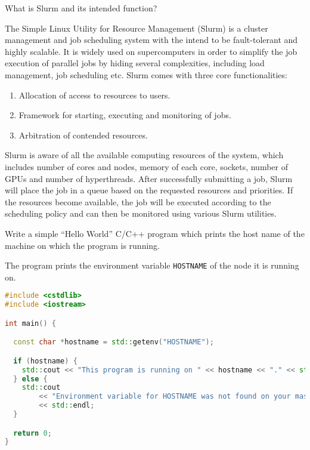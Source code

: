 \begin{question} \label{q:1-2}
What is Slurm and its intended function?
\end{question}
The Simple Linux Utility for Resource Management (Slurm) is a cluster management and job scheduling system with the intend to be fault-tolerant and highly scalable. It is widely used on supercomputers in order to simplify the job execution of parallel jobs by hiding several complexities, including load management, job scheduling etc. Slurm comes with three core functionalities:
\begin{enumerate}
	\item Allocation of access to resources to users.
	\item Framework for starting, executing and monitoring of jobs.
	\item Arbitration of contended resources.
\end{enumerate}
Slurm is aware of all the available computing resources of the system, which includes number of cores and nodes, memory of each core, sockets, number of GPUs and number of hyperthreads. After successfully submitting a job, Slurm will place the job in a queue based on the requested resources and priorities. If the resources become available, the job will be executed according to the scheduling policy and can then be monitored using various Slurm utilities.\cite{noauthor_compute_nodate, noauthor_slurm_nodate} 

\begin{question} \label{q:1-3}
Write a simple “Hello World” C/C++ program which prints the host name of the machine on which the program
is running.
\end{question}
The program prints the environment variable \texttt{HOSTNAME} of the node it is running on.
\begin{lstlisting}[language=C++, caption=Hello World]
#include <cstdlib>
#include <iostream>

int main() {

  const char *hostname = std::getenv("HOSTNAME");

  if (hostname) {
    std::cout << "This program is running on " << hostname << "." << std::endl;
  } else {
    std::cout
        << "Environment variable for HOSTNAME was not found on your maschine."
        << std::endl;
  }

  return 0;
}
\end{lstlisting}

